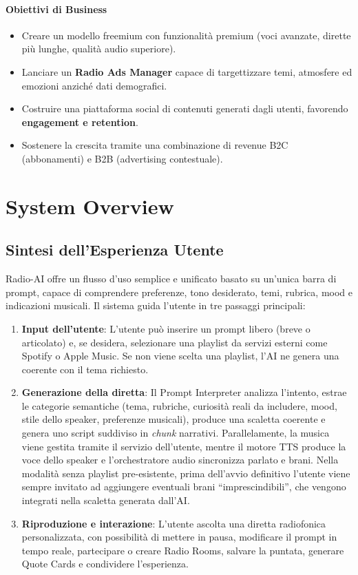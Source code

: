\documentclass[11pt,a4paper]{article}
\begin{document}
\paragraph{Obiettivi di Business}
\begin{itemize}
    \item Creare un modello freemium con funzionalità premium (voci avanzate, dirette più lunghe, qualità audio superiore).
    \item Lanciare un \textbf{Radio Ads Manager} capace di targettizzare temi, atmosfere ed emozioni anziché dati demografici.
    \item Costruire una piattaforma social di contenuti generati dagli utenti, favorendo \textbf{engagement e retention}.
    \item Sostenere la crescita tramite una combinazione di revenue B2C (abbonamenti) e B2B (advertising contestuale).
\end{itemize}%
\section{System Overview}

\subsection{Sintesi dell'Esperienza Utente}

Radio-AI offre un flusso d’uso semplice e unificato basato su un’unica barra di prompt, capace di comprendere preferenze, tono desiderato, temi, rubrica, mood e indicazioni musicali. Il sistema guida l’utente in tre passaggi principali:

\begin{enumerate}
    \item \textbf{Input dell’utente}:  
    L’utente può inserire un prompt libero (breve o articolato) e, se desidera, selezionare una playlist da servizi esterni come Spotify o Apple Music. Se non viene scelta una playlist, l’AI ne genera una coerente con il tema richiesto.

    \item \textbf{Generazione della diretta}:  
    Il Prompt Interpreter analizza l’intento, estrae le categorie semantiche (tema, rubriche, curiosità reali da includere, mood, stile dello speaker, preferenze musicali), produce una scaletta coerente e genera uno script suddiviso in \emph{chunk} narrativi.  
    Parallelamente, la musica viene gestita tramite il servizio dell’utente, mentre il motore TTS produce la voce dello speaker e l’orchestratore audio sincronizza parlato e brani. Nella modalità senza playlist pre-esistente, prima dell’avvio definitivo l’utente viene sempre invitato ad aggiungere eventuali brani “imprescindibili”, che vengono integrati nella scaletta generata dall’AI.

    \item \textbf{Riproduzione e interazione}:  
    L’utente ascolta una diretta radiofonica personalizzata, con possibilità di mettere in pausa, modificare il prompt in tempo reale, partecipare o creare Radio Rooms, salvare la puntata, generare Quote Cards e condividere l’esperienza.
\end{enumerate}
\end{document}
